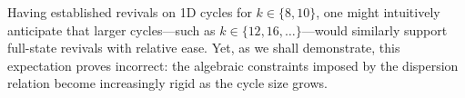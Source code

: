 Having established revivals on 1D cycles for \(k \in \{8,10\}\), one
might intuitively anticipate that larger cycles---such as
\(k \in \{12,16,\dots\}\)---would similarly support full-state revivals
with relative ease. Yet, as we shall demonstrate, this expectation
proves incorrect: the algebraic constraints imposed by the dispersion
relation become increasingly rigid as the cycle size grows.

